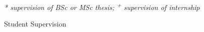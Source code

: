 

\cventry
    {\begin{small}\textit{* supervision of BSc or MSc thesis; \textsuperscript{+} supervision of internship}\end{small}} %
    {Student Supervision} %
    {} %
    {} %
    {
    }

\vspace{-0.8cm}
